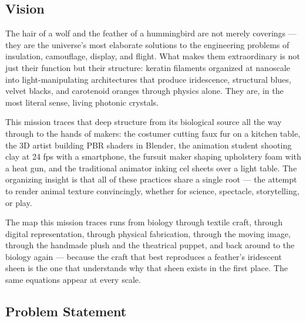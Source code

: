 \documentclass[11pt,letterpaper]{article}
\begin{document}
\subsection{Vision}

The hair of a wolf and the feather of a hummingbird are not merely coverings --- they are the universe's most elaborate solutions to the engineering problems of insulation, camouflage, display, and flight. What makes them extraordinary is not just their function but their structure: keratin filaments organized at nanoscale into light-manipulating architectures that produce iridescence, structural blues, velvet blacks, and carotenoid oranges through physics alone. They are, in the most literal sense, living photonic crystals.

This mission traces that deep structure from its biological source all the way through to the hands of makers: the costumer cutting faux fur on a kitchen table, the 3D artist building PBR shaders in Blender, the animation student shooting clay at 24 fps with a smartphone, the fursuit maker shaping upholstery foam with a heat gun, and the traditional animator inking cel sheets over a light table. The organizing insight is that all of these practices share a single root --- the attempt to render animal texture convincingly, whether for science, spectacle, storytelling, or play.

The map this mission traces runs from biology through textile craft, through digital representation, through physical fabrication, through the moving image, through the handmade plush and the theatrical puppet, and back around to the biology again --- because the craft that best reproduces a feather's iridescent sheen is the one that understands why that sheen exists in the first place. The same equations appear at every scale.

\subsection{Problem Statement}
\end{document}
